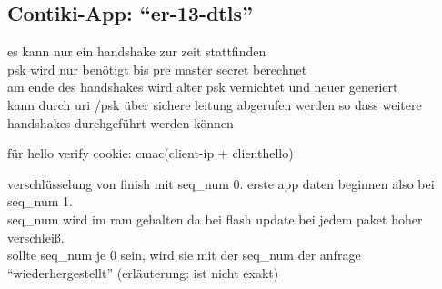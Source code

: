 \subsection{Contiki-App: "`er-13-dtls"'}

es kann nur ein handshake zur zeit stattfinden\\
psk wird nur benötigt bis pre master secret berechnet\\
am ende des handshakes wird alter psk vernichtet und neuer generiert\\
kann durch uri /psk über sichere leitung abgerufen werden so dass weitere handshakes durchgeführt werden können

für hello verify cookie: cmac(client-ip + clienthello)

verschlüsselung von finish mit seq\_num 0. erste app daten beginnen also bei seq\_num 1.\\
seq\_num wird im ram gehalten da bei flash update bei jedem paket hoher verschleiß.\\
sollte seq\_num je 0 sein, wird sie mit der seq\_num der anfrage "`wiederhergestellt"' (erläuterung: ist nicht exakt)